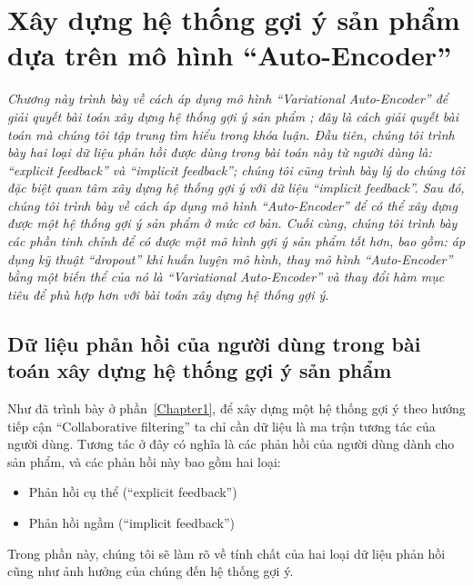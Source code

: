 \chapter{Xây dựng hệ thống gợi ý sản phẩm dựa trên mô hình ``Auto-Encoder''}
\graphicspath{{Chapter3/Chapter3Figs}}
\label{Chapter3}
\justifying

\setlength{\parindent}{6.5ex}
\textit{Chương này trình bày về cách áp dụng mô hình ``Variational Auto-Encoder'' để giải quyết bài toán xây dựng hệ thống gợi ý sản phẩm \cite{mvae}; đây là cách giải quyết bài toán mà chúng tôi tập trung tìm hiểu trong khóa luận. 
Đầu tiên, chúng tôi trình bày hai loại dữ liệu phản hồi được dùng trong bài toán này từ người dùng là:
``explicit feedback'' và ``implicit feedback''; chúng tôi cũng trình bày lý do chúng tôi đặc biệt quan tâm xây dựng hệ thống gợi ý với dữ liệu ``implicit feedback''.
Sau đó, chúng tôi trình bày về cách áp dụng mô hình ``Auto-Encoder'' để có thể xây dựng được một hệ thống gợi ý sản phẩm ở mức cơ bản. 
Cuối cùng, chúng tôi trình bày các phần tinh chỉnh để có được một mô hình gợi ý sản phẩm tốt hơn, bao gồm: áp dụng kỹ thuật ``dropout'' khi huấn luyện mô hình, thay mô hình ``Auto-Encoder'' bằng một biến thể của nó là ``Variational Auto-Encoder'' và thay đổi hàm mục tiêu để phù hợp hơn với bài toán xây dựng hệ thống gợi ý.}


\section{Dữ liệu phản hồi của người dùng trong bài toán xây dựng hệ thống gợi ý sản phẩm}
    Như đã trình bày ở phần~\ref{Chapter1}, để xây dựng một hệ thống gợi ý 
    theo hướng tiếp cận ``Collaborative filtering'' ta chỉ cần dữ liệu là ma trận tương tác của người dùng.
    Tương tác ở đây có nghĩa là các phản hồi của người dùng dành cho sản phẩm, và các phản hồi này bao gồm hai loại:
    \begin{itemize}
        \item Phản hồi cụ thể (``explicit feedback'')
        \item Phản hồi ngầm (``implicit feedback'')
    \end{itemize}
    Trong phần này, chúng tôi sẽ làm rõ về tính chất của hai loại dữ liệu phản hồi cũng như ảnh hưởng của chúng đến hệ thống gợi ý.
